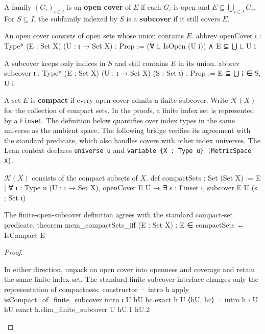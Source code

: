 \begin{definition} \label{an1:def:open-cover}
  A family $(G_i)_{i\in I}$ is an \textbf{open cover} of $E$ if each $G_i$ is open and $E\subseteq\bigcup_{i\in I}G_i$.
  For $S\subseteq I$, the subfamily indexed by $S$ is a \textbf{subcover} if it still covers $E$.
  \begin{lean}{An open cover consists of open sets whose union contains $E$.}
    abbrev openCover {ι : Type*} (E : Set X) (U : ι → Set X) : Prop :=
      (∀ i, IsOpen (U i)) ∧ E ⊆ ⋃ i, U i
  \end{lean}
  \begin{lean}{A subcover keeps only indices in $S$ and still contains $E$ in its union.}
    abbrev subcover {ι : Type*} (E : Set X) (U : ι → Set X) (S : Set ι) : Prop :=
      E ⊆ ⋃ i ∈ S, U i
  \end{lean}
\end{definition}

\begin{definition} \label{an1:def:compact}
  A set $E$ is \textbf{compact} if every open cover admits a finite subcover.
  Write $\mathcal K(X)$ for the collection of compact sets. In the proofs, a finite index set is represented by a \texttt{Finset}.
  The definition below quantifies over index types in the same universe as the ambient space. The following bridge verifies its agreement with the standard predicate, which also handles covers with other index universes. The Lean context declares \texttt{universe u} and \texttt{variable \{X : Type u\} [MetricSpace X]}.
  \begin{lean}{$\mathcal K(X)$ consists of the compact subsets of $X$.}
    def compactSets : Set (Set X) :=
      {E | ∀ {ι : Type u} (U : ι → Set X), openCover E U →
        ∃ s : Finset ι, subcover E U (s : Set ι)}
  \end{lean}
\end{definition}

\begin{lemma} \label{an1:lem:mem-compactSets-iff}
  \begin{lean}{The finite-open-subcover definition agrees with the standard compact-set predicate.}
    theorem mem_compactSets_iff (E : Set X) : E ∈ compactSets ↔ IsCompact E
  \end{lean}
\end{lemma}

\begin{proof}
  \begin{lean}{In either direction, unpack an open cover into openness and coverage and retain the same finite index set. The standard finite-subcover interface changes only the representation of compactness.}
    constructor
    · intro h
      apply isCompact_of_finite_subcover
      intro ι U hU hc
      exact h U ⟨hU, hc⟩
    · intro h ι U hU
      exact h.elim_finite_subcover U hU.1 hU.2
  \end{lean}

\end{proof}

